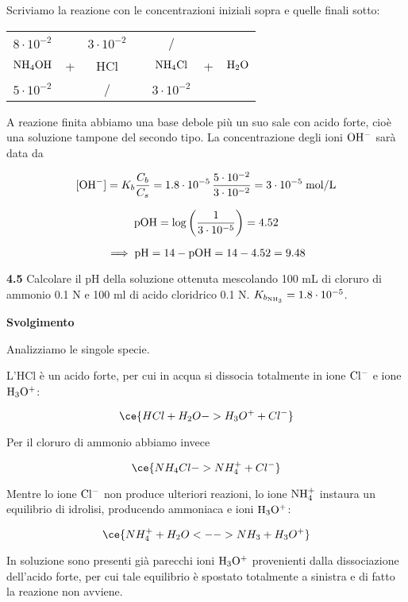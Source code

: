 Scriviamo la reazione con le concentrazioni iniziali sopra e quelle finali sotto:

\begin{center}
    \begin{tabular}{ccccccc}
        $8 \cdot 10^{-2}$ &  & $3 \cdot 10^{-2}$ & & / &&\\
        $\rm NH_4OH$ & + & HCl & \ce{->} & $\rm NH_4Cl$ & + & $\rm H_2O$\\
        $5 \cdot 10^{-2}$ &  &  / & & $3 \cdot 10^{-2}$&&\\
    \end{tabular}
\end{center}

A reazione finita abbiamo una base debole più un suo sale con acido forte, cioè una soluzione tampone del secondo tipo. La concentrazione degli ioni $\rm OH^-$ sarà data da

$$[\text{OH}^-]=K_b\frac{C_b}{C_s}
=1.8 \cdot 10^{-5}\,\frac{5 \cdot 10^{-2}}{3 \cdot 10^{-2}}
= 3 \cdot 10^{-5} \; \rm mol/L$$

$$\rm pOH=\log\left(\frac{1}{3 \cdot 10^{-5}}\right)=4.52$$

$$\implies \rm pH=14-pOH=14-4.52=9.48$$

\vspace{0.2cm}\textbf{4.5} Calcolare il pH della soluzione ottenuta mescolando 100 mL di cloruro di ammonio 0.1 N e 100 ml di acido cloridrico 0.1 N. $K_{b_{\rm NH_3}}=1.8 \cdot 10^{-5}$.

\vspace{0.2cm}\large\textbf{Svolgimento}\normalsize

\vspace{0.2cm}Analizziamo le singole specie.

L'HCl è un acido forte, per cui in acqua si dissocia totalmente in ione $\rm Cl^-$ e ione $\rm H_3O^+$:

$$\ce{HCl + H_2O -> H_3O^+ + Cl^-}$$

Per il cloruro di ammonio abbiamo invece

$$\ce{NH_4Cl -> NH_4^+ + Cl^-}$$

Mentre lo ione $\rm Cl^-$ non produce ulteriori reazioni, lo ione $\rm NH_4^+$ instaura un equilibrio di idrolisi, producendo ammoniaca e ioni $\rm H_3O^+$:

$$\ce{NH_4^+ + H_2O <--> NH_3 + H_3O^+}$$

In soluzione sono presenti già parecchi ioni $\rm H_3O^+$ provenienti dalla dissociazione dell'acido forte, per cui tale equilibrio è spostato totalmente a sinistra e di fatto la reazione non avviene.

